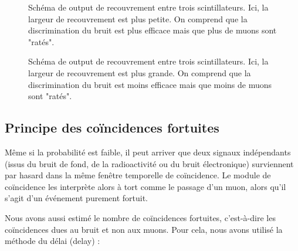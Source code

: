 \documentclass[a4paper,12pt,twoside]{article}
\begin{document}
\begin{figure}[H]
  \begin{minipage}[t]{0.48\textwidth}
    \centering
    
    \caption{Schéma de output de recouvrement entre trois scintillateurs. Ici, la largeur de recouvrement est plus petite. On comprend que la discrimination du bruit est plus efficace mais que plus de muons sont "ratés".}
    \label{fig:recouvrement_petit_width}
  \end{minipage}
  \hfill
  \begin{minipage}[t]{0.48\textwidth} 
    \centering
    
    \caption{Schéma de output de recouvrement entre trois scintillateurs. Ici, la largeur de recouvrement est plus grande. On comprend que la discrimination du bruit est moins efficace mais que moins de muons sont "ratés".}
    \label{fig:recouvrment_grand_width}
  \end{minipage}
\end{figure}



\subsection{Principe des coïncidences fortuites}

\begin{center}
\begin{tcolorbox}[colback=blue!5!white, colframe=blue!60!black, title=Principe des coïncidences fortuites]
Même si la probabilité est faible, il peut arriver que deux signaux indépendants (issus du bruit de fond, de la radioactivité ou du bruit électronique) surviennent par hasard dans la même fenêtre temporelle de coïncidence. Le module de coïncidence les interprète alors à tort comme le passage d’un muon, alors qu’il s’agit d’un événement purement fortuit.
\end{tcolorbox}
\end{center}

Nous avons aussi estimé le nombre de coïncidences fortuites, c’est-à-dire les coïncidences dues au bruit et non aux muons. Pour cela, nous avons utilisé la méthode du délai (delay) :
\end{document}
